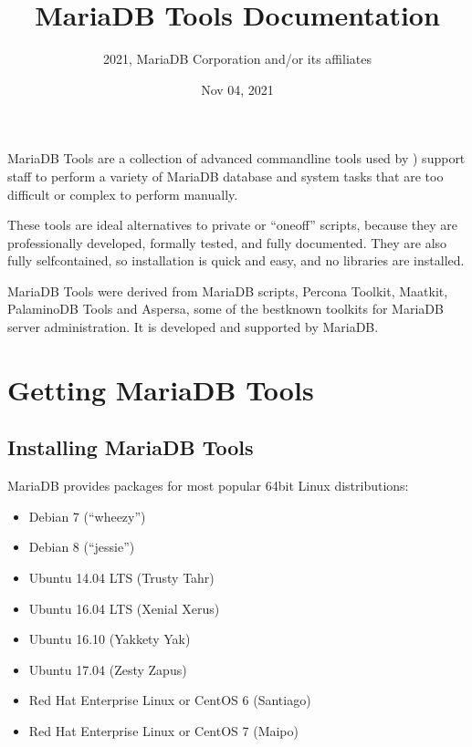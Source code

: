 \documentclass[letterpaper,10pt,english]{sphinxmanual}
\title{MariaDB Tools Documentation}
\date{Nov 04, 2021}
\author{2021, MariaDB Corporation and/or its affiliates}
\begin{document}
\pagestyle{empty}
\sphinxmaketitle
\pagestyle{plain}
\sphinxtableofcontents
\pagestyle{normal}
\label{\detokenize{index::doc}}


MariaDB Tools are a collection of advanced command\sphinxhyphen{}line tools
used by ) support staff
to perform a variety of MariaDB database and system tasks
that are too difficult or complex to perform manually.

These tools are ideal alternatives to private or “one\sphinxhyphen{}off” scripts,
because they are professionally developed, formally tested,
and fully documented.
They are also fully self\sphinxhyphen{}contained,
so installation is quick and easy,
and no libraries are installed.

MariaDB Tools were derived from MariaDB scripts, Percona Toolkit,
Maatkit, PalaminoDB Tools and Aspersa,
some of the best\sphinxhyphen{}known toolkits for MariaDB server administration.
It is developed and supported by MariaDB.


\part{Getting MariaDB Tools}
\label{\detokenize{index:getting-mariadb-tools}}

\chapter{Installing MariaDB Tools}
\label{\detokenize{installation:installing-mariadb-tools}}\label{\detokenize{installation:install}}\label{\detokenize{installation::doc}}
MariaDB provides packages for most popular 64\sphinxhyphen{}bit Linux distributions:
\begin{itemize}
\item {} 
Debian 7 (“wheezy”)

\item {} 
Debian 8 (“jessie”)

\item {} 
Ubuntu 14.04 LTS (Trusty Tahr)

\item {} 
Ubuntu 16.04 LTS (Xenial Xerus)

\item {} 
Ubuntu 16.10 (Yakkety Yak)

\item {} 
Ubuntu 17.04 (Zesty Zapus)

\item {} 
Red Hat Enterprise Linux or CentOS 6 (Santiago)

\item {} 
Red Hat Enterprise Linux or CentOS 7 (Maipo)

\end{itemize}
\end{document}
